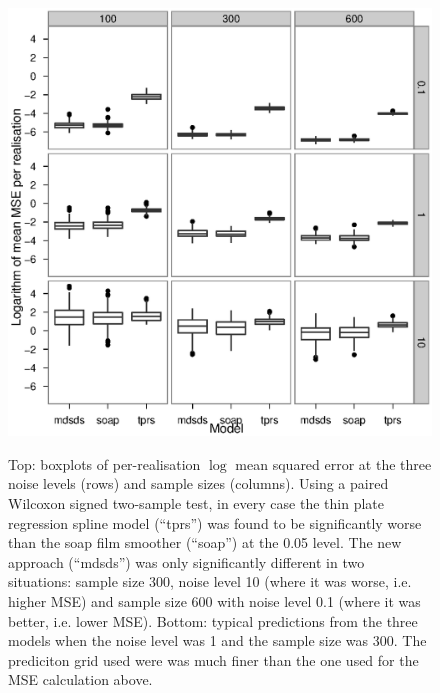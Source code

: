 \documentclass[useAMS,referee, usegraphicx]{biom}
\begin{document}
\begin{figure}
\centering
\includegraphics[width=\textwidth]{examples/ramsay/ramsay-result.eps} \\%
\caption{Top: boxplots of per-realisation $\log$ mean squared error at the three noise levels (rows) and sample sizes (columns). Using a paired Wilcoxon signed two-sample test, in every case the thin plate regression spline model (``tprs'') was found to be significantly worse than the soap film smoother (``soap'') at the 0.05 level. The new approach (``mdsds'') was only significantly different in two situations: sample size 300, noise level 10 (where it was worse, i.e. higher MSE) and sample size 600 with noise level 0.1 (where it was better, i.e. lower MSE). Bottom: typical predictions from the three models when the noise level was 1 and the sample size was 300. The prediciton grid used were was much finer than the one used for the MSE calculation above.}
\label{ramsay-results}
\end{figure}
\end{document}
